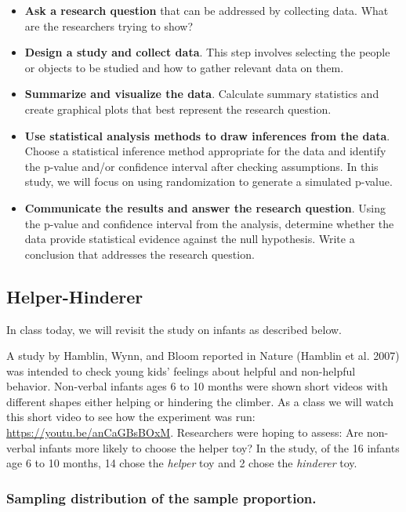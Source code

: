 \documentclass[
]{report}
\begin{document}
\begin{itemize}
\item
  \textbf{Ask a research question} that can be addressed by collecting data. What are the researchers trying to show?
\item
  \textbf{Design a study and collect data}. This step involves selecting the people or objects to be studied and how to gather relevant data on them.
\item
  \textbf{Summarize and visualize the data}. Calculate summary statistics and create graphical plots that best represent the research question.
\item
  \textbf{Use statistical analysis methods to draw inferences from the data}. Choose a statistical inference method appropriate for the data and identify the p-value and/or confidence interval after checking assumptions. In this study, we will focus on using randomization to generate a simulated p-value.
\item
  \textbf{Communicate the results and answer the research question}. Using the p-value and confidence interval from the analysis, determine whether the data provide statistical evidence against the null hypothesis. Write a conclusion that addresses the research question.
\end{itemize}

\subsection{Helper-Hinderer}\label{helper-hinderer-1}

In class today, we will revisit the study on infants as described below.

A study by Hamblin, Wynn, and Bloom reported in Nature (Hamblin et al. 2007) was intended to check young kids' feelings about helpful and non-helpful behavior. Non-verbal infants ages 6 to 10 months were shown short videos with different shapes either helping or hindering the climber. As a class we will watch this short video to see how the experiment was run: \url{https://youtu.be/anCaGBsBOxM}. Researchers were hoping to assess: Are non-verbal infants more likely to choose the helper toy? In the study, of the 16 infants age 6 to 10 months, 14 chose the \emph{helper} toy and 2 chose the \emph{hinderer} toy.

\subsubsection*{Sampling distribution of the sample proportion.}\label{sampling-distribution-of-the-sample-proportion.}
\end{document}
